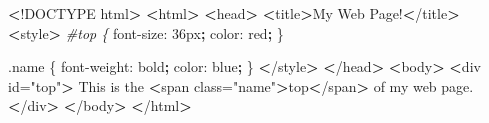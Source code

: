 \documentclass[]{book}
\newenvironment{Shaded}{\begin{snugshade}}{\end{snugshade}}
\newcommand{\CommentTok}[1]{\textcolor[rgb]{0.56,0.35,0.01}{\textit{#1}}}
\newcommand{\ExtensionTok}[1]{#1}
\newcommand{\FunctionTok}[1]{\textcolor[rgb]{0.00,0.00,0.00}{#1}}
\newcommand{\KeywordTok}[1]{\textcolor[rgb]{0.13,0.29,0.53}{\textbf{#1}}}
\newcommand{\NormalTok}[1]{#1}
\newcommand{\OperatorTok}[1]{\textcolor[rgb]{0.81,0.36,0.00}{\textbf{#1}}}
\newcommand{\StringTok}[1]{\textcolor[rgb]{0.31,0.60,0.02}{#1}}
\begin{document}
\begin{Shaded}
\begin{Highlighting}[]
\OperatorTok{<}\NormalTok{!}\ExtensionTok{DOCTYPE}\NormalTok{ html}\OperatorTok{>}                                                         
\OperatorTok{<}\ExtensionTok{html}\OperatorTok{>}                                                                  
    \OperatorTok{<}\FunctionTok{head}\OperatorTok{>}                                                              
        \OperatorTok{<}\ExtensionTok{title}\OperatorTok{>}\NormalTok{My Web Page!}\OperatorTok{<}\NormalTok{/title}\OperatorTok{>}                                     
        \OperatorTok{<}\ExtensionTok{style}\OperatorTok{>}                                                         
            \CommentTok{#top \{                                                      }
                \ExtensionTok{font-size}\NormalTok{: 36px}\KeywordTok{;}                                        
                \ExtensionTok{color}\NormalTok{: red}\KeywordTok{;}                                             
\NormalTok{            \}                                                           }
                                                                        
            \ExtensionTok{.name}\NormalTok{ \{                                                     }
                \ExtensionTok{font-weight}\NormalTok{: bold}\KeywordTok{;}                                      
                \ExtensionTok{color}\NormalTok{: blue}\KeywordTok{;}                                            
\NormalTok{            \}                                                           }
        \OperatorTok{<}\NormalTok{/}\ExtensionTok{style}\OperatorTok{>}                                                        
    \OperatorTok{<}\NormalTok{/}\ExtensionTok{head}\OperatorTok{>}                                                             
    \OperatorTok{<}\ExtensionTok{body}\OperatorTok{>}                                                              
        \OperatorTok{<}\ExtensionTok{div}\NormalTok{ id=}\StringTok{"top"}\OperatorTok{>}                                                  
            \ExtensionTok{This}\NormalTok{ is the }\OperatorTok{<}\NormalTok{span class=}\StringTok{"name"}\OperatorTok{>}\NormalTok{top}\OperatorTok{<}\NormalTok{/span}\OperatorTok{>}\NormalTok{ of my web page.   }
        \OperatorTok{<}\NormalTok{/}\ExtensionTok{div}\OperatorTok{>}                                                          
    \OperatorTok{<}\NormalTok{/}\ExtensionTok{body}\OperatorTok{>}                                                             
\OperatorTok{<}\NormalTok{/}\ExtensionTok{html}\OperatorTok{>}
\end{Highlighting}
\end{Shaded}
\end{document}
